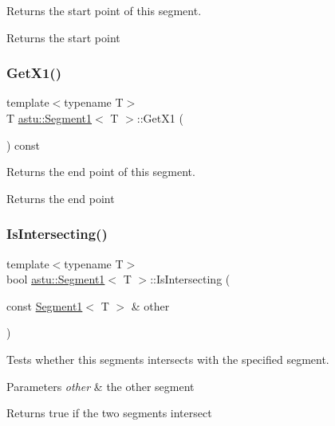 Returns the start point of this segment.

\begin{DoxyReturn}{Returns}
the start point 
\end{DoxyReturn}
\mbox{\label{classastu_1_1Segment1_a04f54b79380ec77d7e0f66c4c3ed06b1}} 
\subsubsection{\texorpdfstring{Get\+X1()}{GetX1()}}
{\footnotesize\ttfamily template$<$typename T$>$ \\
T \hyperlink{classastu_1_1Segment1}{astu\+::\+Segment1}$<$ T $>$\+::Get\+X1 (\begin{DoxyParamCaption}{ }\end{DoxyParamCaption}) const\hspace{0.3cm}{\ttfamily [inline]}}

Returns the end point of this segment.

\begin{DoxyReturn}{Returns}
the end point 
\end{DoxyReturn}
\mbox{\label{classastu_1_1Segment1_a75937f0b835432e56b620b506d61d137}} 
\subsubsection{\texorpdfstring{Is\+Intersecting()}{IsIntersecting()}}
{\footnotesize\ttfamily template$<$typename T$>$ \\
bool \hyperlink{classastu_1_1Segment1}{astu\+::\+Segment1}$<$ T $>$\+::Is\+Intersecting (\begin{DoxyParamCaption}\item[{const \hyperlink{classastu_1_1Segment1}{Segment1}$<$ T $>$ \&}]{other }\end{DoxyParamCaption})\hspace{0.3cm}{\ttfamily [inline]}}

Tests whether this segments intersects with the specified segment.


\begin{DoxyParams}{Parameters}
{\em other} & the other segment \\
\hline
\end{DoxyParams}
\begin{DoxyReturn}{Returns}
{\ttfamily true} if the two segments intersect 
\end{DoxyReturn}
\mbox{\label{classastu_1_1Segment1_aa89676784e95c095b99408437f524d11}} 
